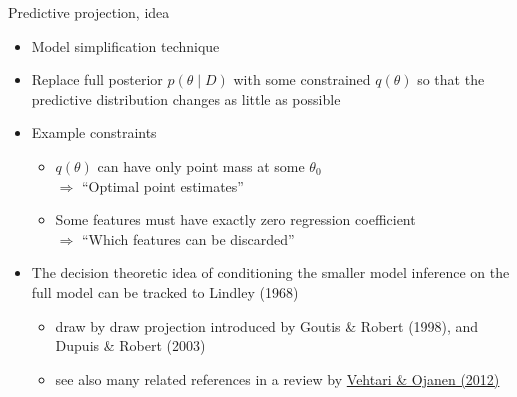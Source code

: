 \documentclass[english,t]{beamer}
\renewcommand{\emph}[1]{\textcolor{navyblue}{#1}}
\begin{document}


  

\begin{frame}{}

  {\Large\color{navyblue} Predictive projection, idea}
  
  \begin{itemize}
  \item Model simplification technique
  \item<2-> Replace full posterior $p(\theta \mid D)$ with
    some constrained $q(\theta)$ so that the \emph{predictive
      distribution} changes as little as possible
  \item<3-> Example constraints
    \begin{itemize}
    \item $q(\theta)$ can have only point mass at some $\theta_0$ \\
      $\Rightarrow$ ``Optimal point estimates''
    \item<4-> Some features must have exactly zero regression coefficient \\
      $\Rightarrow$ ``Which features can be discarded''
    \end{itemize}
    \vspace{1\baselineskip}
  \item<5-> The decision theoretic idea of conditioning the smaller
    model inference on the full model can be tracked to Lindley (1968)
    \begin{itemize}
    \item draw by draw projection introduced by Goutis \& Robert
      (1998), and Dupuis \& Robert (2003)
    \item see also many related references in a review by
      \href{http://dx.doi.org/10.1214/12-SS102}{Vehtari \& Ojanen
        (2012)}
    \end{itemize}
\end{itemize}

\end{frame}
\end{document}
